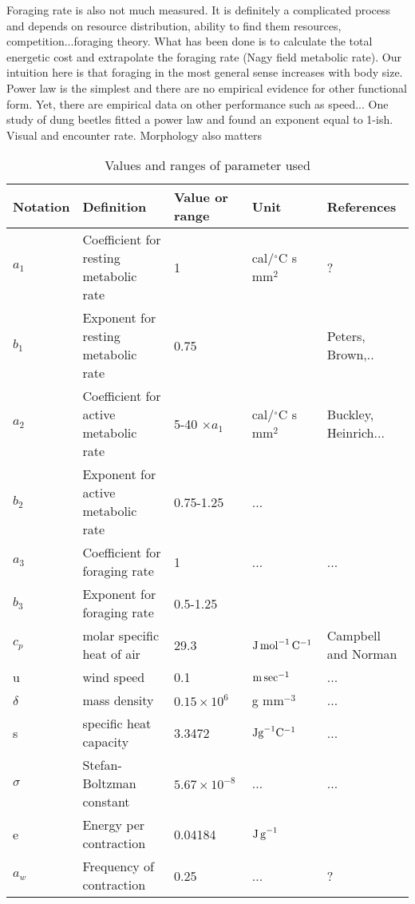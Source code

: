 Foraging rate is also not much measured.
It is definitely a complicated process and depends on resource distribution, ability to find them resources, competition...foraging theory.
What has been done is to calculate the total energetic cost and extrapolate the foraging rate (Nagy field metabolic rate).
Our intuition here is that foraging in the most general sense increases with body size.
Power law is the simplest and there are no empirical evidence for other functional form.
Yet, there are empirical data on other performance such as speed...
One study of dung beetles fitted a power law and found an exponent equal to 1-ish.
Visual and encounter rate. Morphology also matters



\begin{sidewaystable}
\caption{Values and ranges of parameter used }
\begin{tabular}{l l l l l}
\hline
Notation& Definition & Value or range & Unit & References \\ 
\hline
$a_1$ & Coefficient for resting metabolic rate  & 1 &  cal/$^{\circ}$C s mm$^2$ &  ?\citet{Heinrich1975} \\
$b_1$ & Exponent for resting metabolic rate  & 0.75 &  &  Peters, Brown,.. \\
$a_2$ & Coefficient for active metabolic rate  & 5-40 $ \times a_1$ &  cal/$^{\circ}$C s mm$^2$ &  Buckley, Heinrich... \\
$b_2$ & Exponent for active metabolic rate  & 0.75-1.25 & ... &  \citet{Heinrich1975} \\
$a_3$ & Coefficient for foraging rate  & 1 & ...  &  ... \\
$b_3$ & Exponent  for foraging rate  & 0.5-1.25 &  &  \citet{Nervo2014} \\
$c_p$ & molar specific heat of air  & 29.3 &  $\rm{J \, mol}^ {-1} \, \rm{C}^ {-1}$ & Campbell and Norman \\
u &  wind speed & 0.1 & $\rm{m \, sec}^{-1}$ & ...\\
$\delta $ & mass density & $0.15 \times 10^6$  & g  mm$^{-3}$  & ... \\
s & specific heat capacity & 3.3472 & $\rm{J g}^{-1} \rm{C}^{-1}$ & ... \\
$\sigma$ & Stefan-Boltzman constant & $5.67 \times 10^{-8}$ & ... & ...\\
e & Energy per contraction & 0.04184 & $\rm{J \, g}^{-1}$ &\citet{Kammer1974} \\
$a_w$& Frequency of contraction & 0.25 & ...& ?\citet{Bartholomew1977b}\\

\end{tabular}
\end{sidewaystable}
